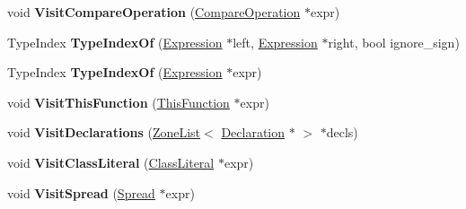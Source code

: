 \begin{DoxyCompactItemize}
\item 
void {\bfseries Visit\+Compare\+Operation} (\hyperlink{classv8_1_1internal_1_1_compare_operation}{Compare\+Operation} $\ast$expr)\hypertarget{classv8_1_1internal_1_1wasm_1_1_asm_wasm_builder_impl_af52756969aef7d7153c2b12cffddef3b}{}\label{classv8_1_1internal_1_1wasm_1_1_asm_wasm_builder_impl_af52756969aef7d7153c2b12cffddef3b}

\item 
Type\+Index {\bfseries Type\+Index\+Of} (\hyperlink{classv8_1_1internal_1_1_expression}{Expression} $\ast$left, \hyperlink{classv8_1_1internal_1_1_expression}{Expression} $\ast$right, bool ignore\+\_\+sign)\hypertarget{classv8_1_1internal_1_1wasm_1_1_asm_wasm_builder_impl_aa5c1d8655e59fb42d0f995f7dbfbd00b}{}\label{classv8_1_1internal_1_1wasm_1_1_asm_wasm_builder_impl_aa5c1d8655e59fb42d0f995f7dbfbd00b}

\item 
Type\+Index {\bfseries Type\+Index\+Of} (\hyperlink{classv8_1_1internal_1_1_expression}{Expression} $\ast$expr)\hypertarget{classv8_1_1internal_1_1wasm_1_1_asm_wasm_builder_impl_ab64b283d5c5e6d8598c53cd6d2f39c6c}{}\label{classv8_1_1internal_1_1wasm_1_1_asm_wasm_builder_impl_ab64b283d5c5e6d8598c53cd6d2f39c6c}

\item 
void {\bfseries Visit\+This\+Function} (\hyperlink{classv8_1_1internal_1_1_this_function}{This\+Function} $\ast$expr)\hypertarget{classv8_1_1internal_1_1wasm_1_1_asm_wasm_builder_impl_a407d456bfc3a4b0ff6fd98781f0d5153}{}\label{classv8_1_1internal_1_1wasm_1_1_asm_wasm_builder_impl_a407d456bfc3a4b0ff6fd98781f0d5153}

\item 
void {\bfseries Visit\+Declarations} (\hyperlink{classv8_1_1internal_1_1_zone_list}{Zone\+List}$<$ \hyperlink{classv8_1_1internal_1_1_declaration}{Declaration} $\ast$ $>$ $\ast$decls)\hypertarget{classv8_1_1internal_1_1wasm_1_1_asm_wasm_builder_impl_aa85a31db32b7f621301ef2f2b20f8f65}{}\label{classv8_1_1internal_1_1wasm_1_1_asm_wasm_builder_impl_aa85a31db32b7f621301ef2f2b20f8f65}

\item 
void {\bfseries Visit\+Class\+Literal} (\hyperlink{classv8_1_1internal_1_1_class_literal}{Class\+Literal} $\ast$expr)\hypertarget{classv8_1_1internal_1_1wasm_1_1_asm_wasm_builder_impl_ae0047a067faa1e2d023ddd3748fb1ddf}{}\label{classv8_1_1internal_1_1wasm_1_1_asm_wasm_builder_impl_ae0047a067faa1e2d023ddd3748fb1ddf}

\item 
void {\bfseries Visit\+Spread} (\hyperlink{classv8_1_1internal_1_1_spread}{Spread} $\ast$expr)\hypertarget{classv8_1_1internal_1_1wasm_1_1_asm_wasm_builder_impl_ad605728789fc719c0bb1aad7c01bc079}{}\label{classv8_1_1internal_1_1wasm_1_1_asm_wasm_builder_impl_ad605728789fc719c0bb1aad7c01bc079}


\end{DoxyCompactItemize}
